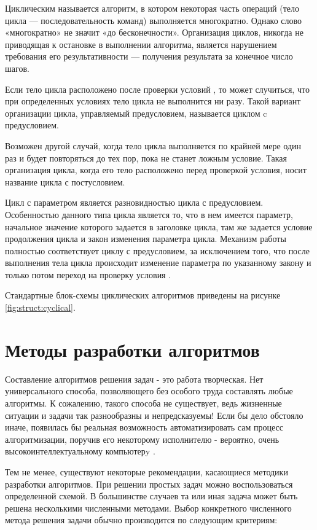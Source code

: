 Циклическим называется алгоритм, в котором некоторая часть операций (тело цикла — последовательность команд) выполняется многократно. Однако слово «многократно» не значит «до бесконечности». Организация циклов, никогда не приводящая к остановке в выполнении алгоритма, является нарушением требования его результативности — получения результата за конечное число шагов.

Если тело цикла расположено после проверки условий , то может случиться, что при определенных условиях тело цикла не выполнится ни разу. Такой вариант организации цикла, управляемый предусловием, называется циклом c предусловием.

Возможен другой случай, когда тело цикла выполняется по крайней мере один раз и будет повторяться до тех пор, пока не станет ложным условие. Такая организация цикла, когда его тело расположено перед проверкой условия, носит название цикла с постусловием.

Цикл с параметром является разновидностью цикла с предусловием. Особенностью данного типа цикла является то, что в нем имеется параметр, начальное значение которого задается в заголовке цикла, там же задается условие продолжения цикла и закон изменения параметра цикла. Механизм работы полностью соответствует циклу с предусловием, за исключением того, что после выполнения тела цикла происходит изменение параметра по указанному закону и только потом переход на проверку условия \cite{szci:struct}.

Стандартные блок-схемы циклических алгоритмов приведены на рисунке \ref{fig:struct:cyclical}.

\section{Методы разработки алгоритмов}
\label{sub:methods}

Составление алгоритмов решения задач - это работа творческая. Нет универсального способа, позволяющего без особого труда составлять любые алгоритмы. К сожалению, такого способа не существует, ведь жизненные ситуации и задачи так разнообразны и непредсказуемы! Если бы дело обстояло иначе, появилась бы реальная возможность автоматизировать сам процесс алгоритмизации, поручив его некоторому исполнителю - вероятно, очень высокоинтеллектуальному компьютерy \cite{comp:algoritm}.

Тем не менее, существуют некоторые рекомендации, касающиеся методики разработки алгоритмов. При решении простых задач можно воспользоваться определенной схемой. В большинстве случаев та или иная задача может быть решена несколькими численными методами. Выбор конкретного численного метода решения задачи обычно производится по следующим критериям:

